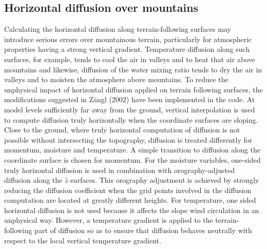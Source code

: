 \subsection{Horizontal diffusion over mountains}
Calculating the horizontal diffusion along terrain-following surfaces may 
introduce serious errors over mountainous terrain, particularly for 
atmospheric properties having a strong vertical gradient. Temperature
diffusion along such surfaces, for example, tends to cool the air in valleys
and to heat that air above mountains and likewise, diffusion of the water mixing
ratio tends to dry the air in valleys and to moisten the atmosphere above 
mountains. To reduce the unphysical impact of horizontal diffusion applied 
on terrain following surfaces, the modifications suggested in Z\"angl (2002)
have been implemented in the code. At model levels sufficiently far away from 
the ground, vertical interpolation is used to compute diffusion truly 
horizontally when the coordinate surfaces are sloping. Close to the ground, 
where truly horizontal computation of diffusion is not possible without 
intersecting the topography, diffusion is treated differently for momentum,
moisture and temperature. A simple transition to diffusion along the
coordinate surface is chosen for momentum. For the moisture variables, 
one-sided truly horizontal diffusion is used in combination with 
orography-adjusted diffusion along the $\hat z$ surfaces. This orography 
adjustment is achieved by strongly reducing the diffusion coefficient 
when the grid points involved in the diffusion computation are located 
at greatly different heights. For temperature, one sided horizontal diffusion 
is not used because it affects the slope wind circulation in an unphysical
way. However, a temperature gradient is applied to the terrain-following
part of diffusion so as to ensure that diffusion behaves neutrally with 
respect to the local vertical temperature gradient.

